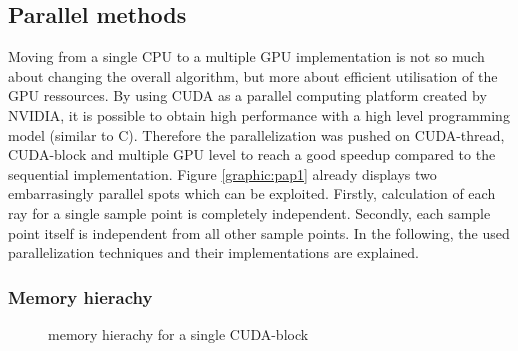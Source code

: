\subsection{Parallel methods}
\label{subsec:parallel_methods}
Moving from a single CPU to a multiple
GPU implementation is not so much about changing the overall algorithm,
but more about efficient utilisation of the GPU ressources. 
By using CUDA\cite{cuda} as a parallel computing platform created by NVIDIA\cite{nvidia},
it is possible to obtain high performance with a high level 
programming model (similar to C). Therefore the parallelization was pushed on CUDA-thread, 
CUDA-block and multiple GPU level to reach a good speedup compared to 
the sequential implementation. 
Figure \ref{graphic:pap1} already displays two embarrasingly parallel spots
which can be exploited. Firstly, calculation of each ray for a single sample
point is completely independent. Secondly, each sample point itself is
independent from all other sample points. 
In the following, the used parallelization
techniques and their implementations are explained.

\subsubsection{Memory hierachy}
\begin{figure}[H]
  \centerline
  {}
  \caption{memory hierachy for a single CUDA-block}
  \label{graphic:memory_hierarchy}
\end{figure}



